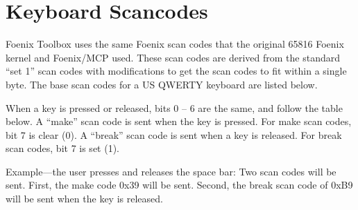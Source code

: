 


\section{Keyboard Scancodes}
Foenix Toolbox uses the same Foenix scan codes that the original 65816 Foenix kernel and Foenix/MCP used.
These scan codes are derived from the standard ``set 1'' scan codes with modifications to get the scan codes to fit within a single byte.
The base scan codes for a US QWERTY keyboard are listed below.

When a key is pressed or released, bits 0 -- 6 are the same, and follow the table below.
A ``make'' scan code is sent when the key is pressed.
For make scan codes, bit 7 is clear (0).
A ``break'' scan code is sent when a key is released.
For break scan codes, bit 7 is set (1).

Example---the user presses and releases the space bar: Two scan codes will be sent.
First, the make code 0x39 will be sent.
Second, the break scan code of 0xB9 will be sent when the key is released.


